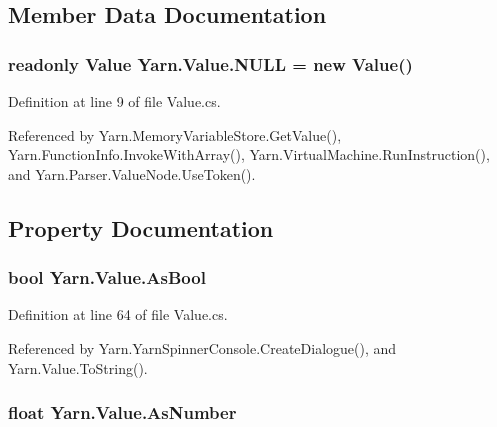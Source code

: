 \subsection{Member Data Documentation}
\hypertarget{a00189_a1ed2964965baca8621c45efa23f37660}{
\subsubsection[{N\-U\-L\-L}]{\setlength{\rightskip}{0pt plus 5cm}readonly {\bf Value} Yarn.\-Value.\-N\-U\-L\-L = new {\bf Value}()\hspace{0.3cm}{\ttfamily [static]}}}\label{a00189_a1ed2964965baca8621c45efa23f37660}


Definition at line 9 of file Value.\-cs.



Referenced by Yarn.\-Memory\-Variable\-Store.\-Get\-Value(), Yarn.\-Function\-Info.\-Invoke\-With\-Array(), Yarn.\-Virtual\-Machine.\-Run\-Instruction(), and Yarn.\-Parser.\-Value\-Node.\-Use\-Token().



\subsection{Property Documentation}
\hypertarget{a00189_a5805faef3b3d376090ff096d6dd6c064}{
\subsubsection[{As\-Bool}]{\setlength{\rightskip}{0pt plus 5cm}bool Yarn.\-Value.\-As\-Bool\hspace{0.3cm}{\ttfamily [get]}}}\label{a00189_a5805faef3b3d376090ff096d6dd6c064}


Definition at line 64 of file Value.\-cs.



Referenced by Yarn.\-Yarn\-Spinner\-Console.\-Create\-Dialogue(), and Yarn.\-Value.\-To\-String().

\hypertarget{a00189_a751419743761562bf902246d6e6a3c0a}{
\subsubsection[{As\-Number}]{\setlength{\rightskip}{0pt plus 5cm}float Yarn.\-Value.\-As\-Number\hspace{0.3cm}{\ttfamily [get]}}}\label{a00189_a751419743761562bf902246d6e6a3c0a}


